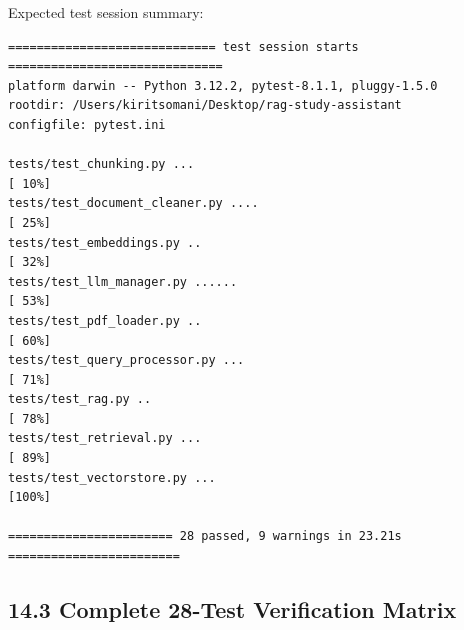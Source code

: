 \documentclass[
]{article}
\begin{document}
Expected test session summary:

\begin{verbatim}
============================= test session starts ==============================
platform darwin -- Python 3.12.2, pytest-8.1.1, pluggy-1.5.0
rootdir: /Users/kiritsomani/Desktop/rag-study-assistant
configfile: pytest.ini

tests/test_chunking.py ...                                               [ 10%]
tests/test_document_cleaner.py ....                                      [ 25%]
tests/test_embeddings.py ..                                              [ 32%]
tests/test_llm_manager.py ......                                         [ 53%]
tests/test_pdf_loader.py ..                                              [ 60%]
tests/test_query_processor.py ...                                        [ 71%]
tests/test_rag.py ..                                                     [ 78%]
tests/test_retrieval.py ...                                              [ 89%]
tests/test_vectorstore.py ...                                            [100%]

======================= 28 passed, 9 warnings in 23.21s ========================
\end{verbatim}

\subsection{14.3 Complete 28-Test Verification
Matrix}\label{complete-28-test-verification-matrix}
\end{document}
